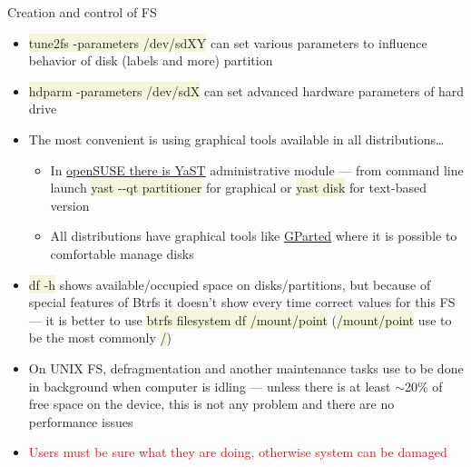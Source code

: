 \documentclass[compress, ucs, xelatex, 11pt, xcolor=svgnames, aspectratio=169,
	hyperref={
		bookmarks=true,
		unicode=true,
		colorlinks=true,
		pdftitle={Linux, command line and MetaCentrum},
		plainpages=false,
		pdfauthor={Vojtech Zeisek},
		pdfsubject={Course about use of Linux command line, writing shell scripts and using MetaCentrum of CESNET},
		pdfcreator={XeLaTeX},
		pdfkeywords={Linux, GNU, BASH, shell, command line, MetaCentrum},
		linkcolor=DarkRed, %
		anchorcolor=DarkBlue, %
		citecolor=Indigo, %
		filecolor=NavyBlue, %
		menucolor=DarkMagenta, %
		urlcolor=DarkBlue, %
		pdftex},
	url={hyphens, lowtilde} %
	]{beamer}
\renewcommand{\texttt}[1]{\colorbox{Beige}{{\ttfamily #1}}}
\renewcommand{\alert}[1]{\textcolor{red}{#1}}
\begin{document}
\begin{frame}[allowframebreaks]{Creation and control of FS}
\begin{itemize}
\begin{itemize}
		\end{itemize}
		\item \texttt{tune2fs -parameters /dev/sdXY} can set various parameters to influence behavior of disk (labels and more) partition
		\item \texttt{hdparm -parameters /dev/sdX} can set advanced hardware parameters of hard drive
		\item The most convenient is using graphical tools available in all distributions\ldots
		\begin{itemize}
			\item In \href{https://en.opensuse.org/Portal:YaST}{openSUSE there is YaST} administrative module --- from command line launch \texttt{yast -{-}qt partitioner} for graphical or \texttt{yast disk} for text-based version
			\item All distributions have graphical tools like \href{https://gparted.org/}{GParted} where it is possible to comfortable manage disks
		\end{itemize}
		\item \texttt{df -h} shows available/occupied space on disks/partitions, but because of special features of Btrfs it doesn't show every time correct values for this FS --- it is better to use \texttt{btrfs filesystem df /mount/point} (\texttt{/mount/point} use to be the most commonly \texttt{/})
		\item On UNIX FS, defragmentation and another maintenance tasks use to be done in background when computer is idling --- unless there is at least $\sim$20\% of free space on the device, this is not any problem and there are no performance issues
		\item \alert{Users must be sure what they are doing, otherwise system can be damaged}
	\end{itemize}
\end{frame}
\end{document}
